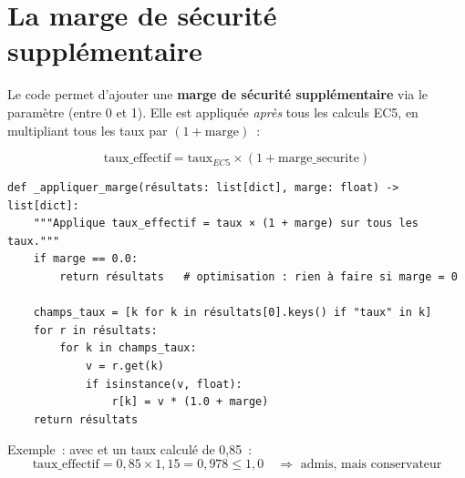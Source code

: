 \section{La marge de s\'ecurit\'e suppl\'ementaire}

Le code permet d'ajouter une \textbf{marge de s\'ecurit\'e suppl\'ementaire}
via le param\`etre  (entre 0 et 1).
Elle est appliqu\'ee \emph{apr\`es} tous les calculs EC5,
en multipliant tous les taux par $(1 + \text{marge})$~:

\begin{equation}
\text{taux\_effectif} = \text{taux}_{EC5} \times (1 + \text{marge\_securite})
\end{equation}

\begin{lstlisting}[style=python, caption={\fichier{moteur.py} --- application de la marge de sécurité (EF-026)}]
def _appliquer_marge(résultats: list[dict], marge: float) -> list[dict]:
    """Applique taux_effectif = taux × (1 + marge) sur tous les taux."""
    if marge == 0.0:
        return résultats   # optimisation : rien à faire si marge = 0

    champs_taux = [k for k in résultats[0].keys() if "taux" in k]
    for r in résultats:
        for k in champs_taux:
            v = r.get(k)
            if isinstance(v, float):
                r[k] = v * (1.0 + marge)
    return résultats
\end{lstlisting}

Exemple~: avec  et un taux calcul\'e de 0{,}85~:
\[
\text{taux\_effectif} = 0{,}85 \times 1{,}15 = 0{,}978 \leq 1{,}0
\quad \Rightarrow \text{ admis, mais conservateur}
\]